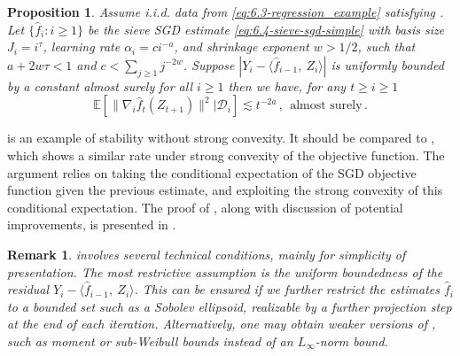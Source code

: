 \documentclass[11pt]{article}
\theoremstyle{plain}
\newtheorem{proposition}[theorem]{Proposition}
\newtheorem{remark}[theorem]{Remark}
\newcommand{\D}{{\mathcal{D}}}
\begin{document}
\begin{proposition}
    \label{pro:6.4-stab-sieve-sgd}
    Assume i.i.d. data from \eqref{eq:6.3-regression_example} satisfying .  Let $\{\hat f_i:i\ge 1\}$ be the sieve SGD estimate \eqref{eq:6.4-sieve-sgd-simple} with basis size $J_i=i^{\tau}$, learning rate $\alpha_i=ci^{-a}$, and shrinkage exponent $w>1/2$, such that $a+2w\tau<1$ and $c<\sum_{j\ge 1}j^{-2w}$.  Suppose $|Y_i-\langle \hat f_{i-1},~Z_i\rangle|$ is uniformly bounded by a constant almost surely for all $i\ge 1$ then we have, for any $t\ge i\ge 1$
    $$
    \mathbb E\left[\|\nabla_i \hat f_t(Z_{t+1})\|^2\bigg|\D_i\right]\lesssim t^{-2a}\,,~~\text{almost surely}\,.
    $$
\end{proposition}

 is an example of stability without strong convexity.  It should be compared to , which shows a similar rate under strong convexity of the objective function. The argument relies on taking the conditional expectation of the SGD objective function given the previous estimate, and exploiting the strong convexity of this conditional expectation.  The proof of , along with discussion of potential improvements, is presented in .

\begin{remark}
    \label{rem:6.4-bounded-residual}
   involves several technical conditions, mainly for simplicity of presentation.  The most restrictive assumption is the uniform boundedness of the residual $Y_i-\langle \hat f_{i-1},~Z_i\rangle$. This can be ensured if we further restrict the estimates $\hat f_i$ to a bounded set such as a Sobolev ellipsoid, realizable by a further projection step at the end of each iteration.  Alternatively, one may obtain weaker versions of , such as moment or sub-Weibull bounds instead of an $L_\infty$-norm bound.
\end{remark}
\end{document}
